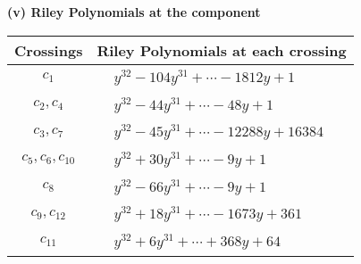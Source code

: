 \documentclass[1p]{elsarticle_modified}
\theoremstyle{definition}
\begin{document}
\newpage\renewcommand{\arraystretch}{1}
\flushleft \textbf{(v) Riley Polynomials at the component}\newline \\
\begin{tabular}{m{50pt}|m{274pt}}
Crossings & \hspace{64pt}Riley Polynomials at each crossing \\
\hline $$\begin{aligned}c_{1}\end{aligned}$$&$\begin{aligned}
&y^{32}-104 y^{31}+\cdots-1812 y+1
\end{aligned}$\\
\hline $$\begin{aligned}c_{2},c_{4}\end{aligned}$$&$\begin{aligned}
&y^{32}-44 y^{31}+\cdots-48 y+1
\end{aligned}$\\
\hline $$\begin{aligned}c_{3},c_{7}\end{aligned}$$&$\begin{aligned}
&y^{32}-45 y^{31}+\cdots-12288 y+16384
\end{aligned}$\\
\hline $$\begin{aligned}c_{5},c_{6},c_{10}\end{aligned}$$&$\begin{aligned}
&y^{32}+30 y^{31}+\cdots-9 y+1
\end{aligned}$\\
\hline $$\begin{aligned}c_{8}\end{aligned}$$&$\begin{aligned}
&y^{32}-66 y^{31}+\cdots-9 y+1
\end{aligned}$\\
\hline $$\begin{aligned}c_{9},c_{12}\end{aligned}$$&$\begin{aligned}
&y^{32}+18 y^{31}+\cdots-1673 y+361
\end{aligned}$\\
\hline $$\begin{aligned}c_{11}\end{aligned}$$&$\begin{aligned}
&y^{32}+6 y^{31}+\cdots+368 y+64
\end{aligned}$\\
\hline
\end{tabular}\\~\\
\end{document}
